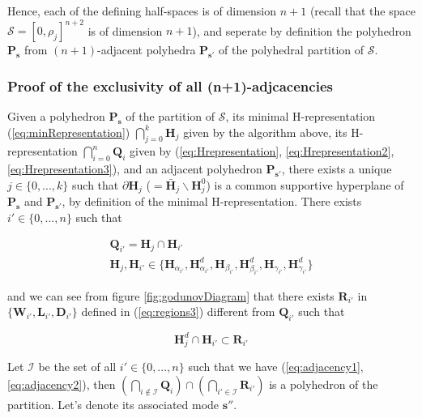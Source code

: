 \noindent Hence, each of the defining half-spaces is of dimension $n+1$ \cite{Gruenbaum2003} (recall that the space $\mathcal{S} = [0,\rho_{j}]^{n+2}$ is of dimension $n+1$), and seperate by definition the polyhedron $\textbf{P}_{\boldsymbol s}$ from $(n+1)$-adjacent polyhedra $\textbf{P}_{\boldsymbol s'}$ of the polyhedral partition of $\mathcal{S}$.


\subsubsection{Proof of the exclusivity of all (n+1)-adjcacencies}\label{sec:adjacency}

Given a polyhedron $\textbf{P}_{\boldsymbol s}$ of the partition of $\mathcal{S}$, its minimal H-representation (\ref{eq:minRepresentation}) $\bigcap_{j=0}^{k} \textbf{H}_{j}$ given by the algorithm above, its H-representation $\bigcap_{i=0}^{n} \textbf{Q}_{i}$ given by (\ref{eq:Hrepresentation}, \ref{eq:Hrepresentation2}, \ref{eq:Hrepresentation3}), and an adjacent polyhedron $\textbf{P}_{\boldsymbol s'}$, there exists a unique $j\in\{0,...,k\}$ such that $\partial \textbf{H}_{j}$ ($=\bar{\textbf{H}}_{j} \backslash \textbf{H}^{0}_{j}$) is a common supportive hyperplane of $\textbf{P}_{\boldsymbol s}$ and $\textbf{P}_{\boldsymbol s'}$, by definition of the minimal H-representation. There exists $i'\in\{0,...,n\}$ such that

\begin{equation}
\begin{array}{l}
\textbf{Q}_{i'}=\textbf{H}_{j}\cap \textbf{H}_{i'}\\
\textbf{H}_{j}, \textbf{H}_{i'}\in \{\textbf{H}_{\alpha_{i'}}, \textbf{H}^{d}_{\alpha_{i'}}, \textbf{H}_{\beta_{i'}}, \textbf{H}^{d}_{\beta_{i'}}, \textbf{H}_{\gamma_{i'}}, \textbf{H}^{d}_{\gamma_{i'}}\}
\end{array}
\label{eq:adjacency1}
\end{equation}

\noindent and we can see from figure \ref{fig:godunovDiagram} that there exists $\textbf{R}_{i'}$ in $\{\textbf{W}_{i'}, \textbf{L}_{i'}, \textbf{D}_{i'}\}$ defined in (\ref{eq:regions3}) different from $\textbf{Q}_{i'}$ such that

\begin{equation}
\textbf{H}^{d}_{j}\cap \textbf{H}_{i'}\subset \textbf{R}_{i'}
\label{eq:adjacency2}
\end{equation}

\noindent Let $\mathcal{I}$ be the set of all $i'\in\{0,...,n\}$ such that we have (\ref{eq:adjacency1}, \ref{eq:adjacency2}), then $(\bigcap_{i\notin \mathcal{I}} \textbf{Q}_{i})\cap (\bigcap_{i'\in\mathcal{I}}\textbf{R}_{i'})$ is a polyhedron of the partition. Let's denote its associated mode $\boldsymbol s''$.

